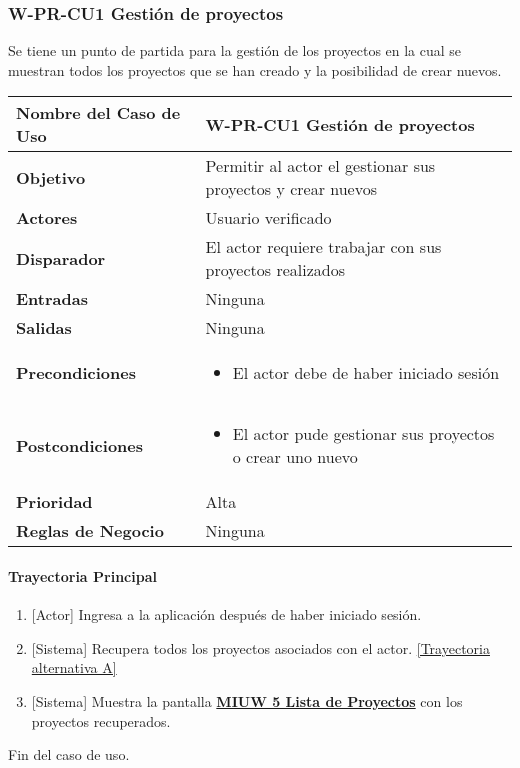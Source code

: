 \subsubsection{W-PR-CU1 Gestión de proyectos}
Se tiene un punto de partida para la gestión de los proyectos en la cual se muestran todos los proyectos que se han creado y la posibilidad de crear nuevos.
\begin{longtable}{|J{5cm}|J{10.3cm}|}
	\hline
	\textbf{Nombre del Caso de Uso} &
		W-PR-CU1 Gestión de proyectos \\ \hline
	\textbf{Objetivo} &
		Permitir al actor el gestionar sus proyectos y crear nuevos \\ \hline
	\textbf{Actores} &
		Usuario verificado \\ \hline 
	\textbf{Disparador} & 
		El actor requiere trabajar con sus proyectos realizados \\ \hline 
	\textbf{Entradas} & 
		Ninguna \\ \hline 
	\textbf{Salidas} & 
		Ninguna \\ \hline
	\textbf{Precondiciones} &
		\begin{itemize}
				\item El actor debe de haber iniciado sesión
		\end{itemize} \\ \hline
	\textbf{Postcondiciones} &
		\begin{itemize}
			\item El actor pude gestionar sus proyectos o crear uno nuevo
		\end{itemize}\\ \hline
	\textbf{Prioridad} & 
		Alta \\ \hline
	\textbf{Reglas de Negocio} & 
		Ninguna \\ \hline

\end{longtable}
\paragraph{Trayectoria Principal}
	\begin{enumerate}
	    \item {[Actor]} Ingresa a la aplicación después de haber iniciado sesión.
	    \item {[Sistema]} Recupera todos los proyectos asociados con el actor. \hyperref[gestion-proyectos:TA]{[Trayectoria alternativa A]}
	    \item {[Sistema]} Muestra la pantalla \hyperref[fig:MIUW-5]{\bf MIUW 5 Lista de Proyectos} con los proyectos recuperados.
	\end{enumerate}
	Fin del caso de uso.

